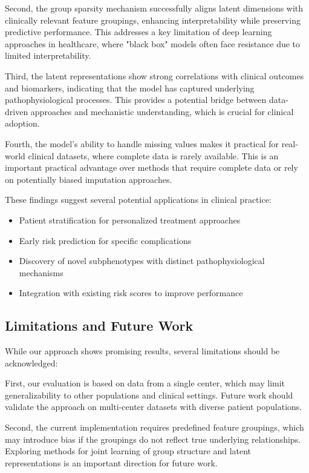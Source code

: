 \documentclass[oupdraft]{bio}
\begin{document}
Second, the group sparsity mechanism successfully aligns latent dimensions with clinically relevant feature groupings, enhancing interpretability while preserving predictive performance. This addresses a key limitation of deep learning approaches in healthcare, where "black box" models often face resistance due to limited interpretability.

Third, the latent representations show strong correlations with clinical outcomes and biomarkers, indicating that the model has captured underlying pathophysiological processes. This provides a potential bridge between data-driven approaches and mechanistic understanding, which is crucial for clinical adoption.

Fourth, the model's ability to handle missing values makes it practical for real-world clinical datasets, where complete data is rarely available. This is an important practical advantage over methods that require complete data or rely on potentially biased imputation approaches.

These findings suggest several potential applications in clinical practice:
\begin{itemize}
    \item Patient stratification for personalized treatment approaches
    \item Early risk prediction for specific complications
    \item Discovery of novel subphenotypes with distinct pathophysiological mechanisms
    \item Integration with existing risk scores to improve performance
\end{itemize}

\subsection{Limitations and Future Work}

While our approach shows promising results, several limitations should be acknowledged:

First, our evaluation is based on data from a single center, which may limit generalizability to other populations and clinical settings. Future work should validate the approach on multi-center datasets with diverse patient populations.

Second, the current implementation requires predefined feature groupings, which may introduce bias if the groupings do not reflect true underlying relationships. Exploring methods for joint learning of group structure and latent representations is an important direction for future work.
\end{document}
